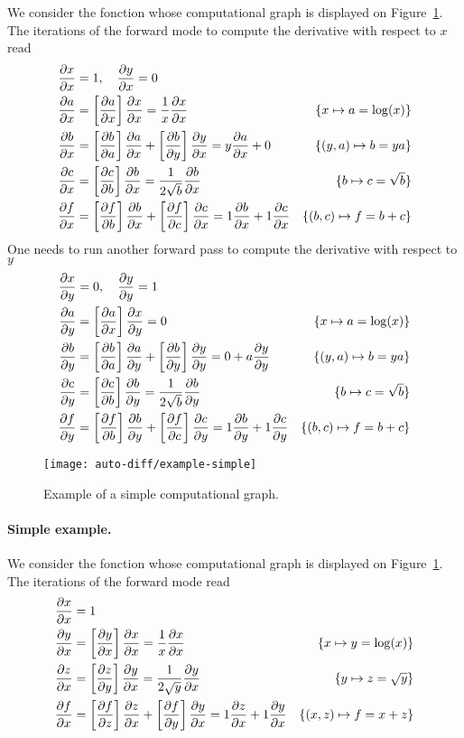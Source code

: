 We consider the fonction 
whose computational graph is displayed on Figure~\ref{fig-dag-example-simple}. The iterations of the forward mode to compute the derivative with respect to $x$ read
\begin{align*}
		\pd{x}{x} &= 1,  \quad \pd{y}{x} = 0 \\
		\pd{a}{x} &= \bk{\pd{a}{x}} \pd{x}{x} = \frac{1}{x} \pd{x}{x} &
			\{x \mapsto a = \log(x)\}\\
		\pd{b}{x} &= \bk{\pd{b}{a}} \pd{a}{x}  + \bk{\pd{b}{y}} \pd{y}{x}  = y \pd{a}{x} + 0 &
			\{(y,a) \mapsto b=ya\}\\
		\pd{c}{x} &= \bk{\pd{c}{b}} \pd{b}{x}  = \frac{1}{2\sqrt{b}} \pd{b}{x}&
			\{b \mapsto c=\sqrt{b}\} \\
		\pd{f}{x} &= \bk{\pd{f}{b}} \pd{b}{x} + \bk{\pd{f}{c}} \pd{c}{x}  = 1\pd{b}{x} + 1\pd{c}{x}&
			\{(b,c) \mapsto f=b+c\}
\end{align*}
One needs to run another forward pass to compute the derivative with respect to $y$
\begin{align*}
		\pd{x}{y} &= 0,  \quad \pd{y}{y} = 1 \\
		\pd{a}{y} &= \bk{\pd{a}{x}} \pd{x}{y} = 0 &
			\{x \mapsto a = \log(x)\}\\
		\pd{b}{y} &= \bk{\pd{b}{a}} \pd{a}{y}  + \bk{\pd{b}{y}} \pd{y}{y}  = 0 + a \pd{y}{y}  &
			\{(y,a) \mapsto b=ya\}\\
		\pd{c}{y} &= \bk{\pd{c}{b}} \pd{b}{y}  = \frac{1}{2\sqrt{b}} \pd{b}{y}&
			\{b \mapsto c=\sqrt{b}\} \\
		\pd{f}{y} &= \bk{\pd{f}{b}} \pd{b}{y} + \bk{\pd{f}{c}} \pd{c}{y}  = 1\pd{b}{y} + 1\pd{c}{y}&
			\{(b,c) \mapsto f=b+c\}
\end{align*}



\begin{figure}
\centering
\texttt{[image: auto-diff/example-simple]}
\caption{\label{fig-dag-example-simple}
Example of a simple computational graph.
}
\end{figure}

\paragraph{Simple example.}

We consider the fonction 
whose computational graph is displayed on Figure~\ref{fig-dag-example-simple}. The iterations of the forward mode read
\begin{align*}
		\pd{x}{x} &= 1 \\
		\pd{y}{x} &= \bk{\pd{y}{x}} \pd{x}{x} = \frac{1}{x} \pd{x}{x} &
			\{x \mapsto y = \log(x)\}\\
		\pd{z}{x} &= \bk{\pd{z}{y}} \pd{y}{x} = \frac{1}{2\sqrt{y}} \pd{y}{x} &
			\{y \mapsto z=\sqrt{y}\}\\
		\pd{f}{x} &= \bk{\pd{f}{z}} \pd{z}{x} + \bk{\pd{f}{y}} \pd{y}{x} = 1 \pd{z}{x} + 1 \pd{y}{x}&
			\{(x,z) \mapsto f=x+z\}
\end{align*}




